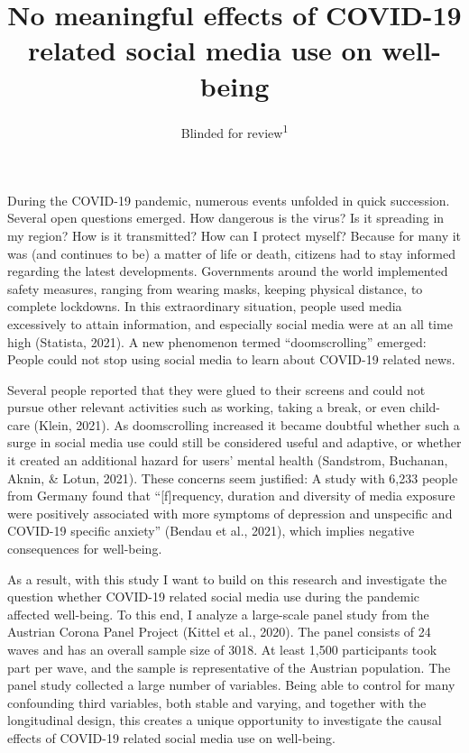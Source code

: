 \documentclass[
  english,
  man,mask,floatsintext]{apa6}
\title{No meaningful effects of COVID-19 related social media use on well-being}
\author{Blinded for review\textsuperscript{1}}
\date{}
\affiliation{\vspace{0.5cm}\textsuperscript{1} Blinded for review}
\begin{document}
\maketitle

During the COVID-19 pandemic,
numerous events unfolded in quick succession.
Several open questions emerged.
How dangerous is the virus?
Is it spreading in my region?
How is it transmitted?
How can I protect myself?
Because for many it was (and continues to be) a matter of life or death, citizens had to stay informed regarding the latest developments.
Governments around the world implemented safety measures, ranging from wearing masks, keeping physical distance, to complete lockdowns.
In this extraordinary situation, people used media excessively to attain information, and especially social media were at an all time high (Statista, 2021).
A new phenomenon termed ``doomscrolling'' emerged:
People could not stop using social media to learn about COVID-19 related news.

Several people reported that they were glued to their screens and could not pursue other relevant activities such as working, taking a break, or even child-care (Klein, 2021).
As doomscrolling increased it became doubtful whether such a surge in social media use could still be considered useful and adaptive, or whether it created an additional hazard for users' mental health (Sandstrom, Buchanan, Aknin, \& Lotun, 2021).
These concerns seem justified: A study with 6,233 people from Germany found that ``{[}f{]}requency, duration and diversity of media exposure were positively associated with more symptoms of depression and unspecific and COVID-19 specific anxiety'' (Bendau et al., 2021), which implies negative consequences for well-being.

As a result, with this study I want to build on this research and investigate the question whether COVID-19 related social media use during the pandemic affected well-being.
To this end, I analyze a large-scale panel study from the Austrian Corona Panel Project (Kittel et al., 2020).
The panel consists of 24 waves and has an overall sample size of 3018.
At least 1,500 participants took part per wave, and the sample is representative of the Austrian population.
The panel study collected a large number of variables.
Being able to control for many confounding third variables, both stable and varying, and together with the longitudinal design, this creates a unique opportunity to investigate the causal effects of COVID-19 related social media use on well-being.
\end{document}
